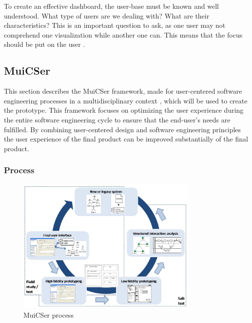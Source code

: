     \noindent To create an effective dashboard, the user-base must be known and well understood. What type of users are we dealing with? What are their characteristics? This is an important question to ask, as one user may not comprehend one visualization while another one can. This means that the focus should be put on the user \cite{brath2004dashboard}.
        

    \subsection{MuiCSer} \label{2_muicser}
    This section describes the MuiCSer framework, made for user-centered software engineering processes in a multidisciplinary context \cite{muicser}, which will be used to create the prototype. This framework focuses on optimizing the user experience during the entire software engineering cycle to ensure that the end-user's needs are fulfilled. By combining user-centered design and software engineering principles the user experience of the final product can be improved substantially of the final product.

        \subsubsection{Process}
        
        \begin{figure}[!t]
            \centering
            \includegraphics[width=0.8\textwidth]{chapters/2_background/muicser}
            \caption{MuiCSer process}\label{fig:muicser}
        \end{figure}

